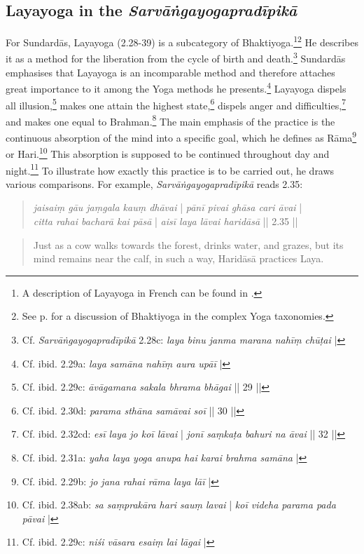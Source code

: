 \subsection{Layayoga in the \textit{Sarvāṅgayogapradīpikā}}
\label{layaintrosarvanga}
For Sundardās, Layayoga (2.28-39) is a subcategory of Bhaktiyoga.\footnote{A description of Layayoga in French can be found in \citeauthor[2014: 693-94]{burger2014sarvangayogapradipika}.}\footnote{See p.\pageref{bhaktiyogaintro} for a discussion of Bhaktiyoga in the complex Yoga taxonomies.} He describes it as a method for the liberation from the cycle of birth and death.\footnote{Cf. \textit{Sarvāṅgayogapradīpikā} 2.28c: \textit{laya binu janma marana nahīṃ chūṭai} |} Sundardās emphasises that Layayoga is an incomparable method and therefore attaches great importance to it among the Yoga methods he presents.\footnote{Cf. ibid. 2.29a: \textit{laya samāna nahīṃ aura upāī} |} Layayoga dispels all illusion,\footnote{Cf. ibid. 2.29c: \textit{āvāgamana sakala bhrama bhāgai} || 29 ||} makes one attain the highest state,\footnote{Cf. ibid. 2.30d: \textit{parama sthāna samāvai soī} || 30 ||} dispels anger and difficulties,\footnote{Cf. ibid. 2.32cd: \textit{esī laya jo koī lāvai} | \textit{jonī saṃkaṭa bahuri na āvai} || 32 ||} and makes one equal to Brahman.\footnote{Cf. ibid. 2.31a: \textit{yaha laya yoga anupa hai karai brahma samāna} |} The main emphasis of the practice is the continuous absorption of the mind into a specific goal, which he defines as Rāma\footnote{Cf. ibid. 2.29b: \textit{jo jana rahai rāma laya lāī} |} or Hari.\footnote{Cf. ibid. 2.38ab: \textit{sa saṃprakāra hari sauṃ lavai} | \textit{koī videha parama pada pāvai} |} This absorption is supposed to be continued throughout day and night.\footnote{Cf. ibid. 2.29c: \textit{niśi vāsara esaiṃ lai lāgai} |} To illustrate how exactly this practice is to be carried out, he draws various comparisons. For example, \textit{Sarvāṅgayogapradīpikā} reads 2.35: 

\begin{quote}
\textit{jaisaiṃ gāu jaṃgala kauṃ dhāvai} | \textit{pānī pivai ghāsa cari āvai} |\\ 
\textit{citta rahai bacharā kai pāsā} | \textit{aisī laya lāvai haridāsā} || 2.35 ||
\end{quote}
\begin{quote}
  Just as a cow walks towards the forest, drinks water, and grazes, but its mind remains near the calf, in such a way, Haridāsā practices Laya.
\end{quote}

